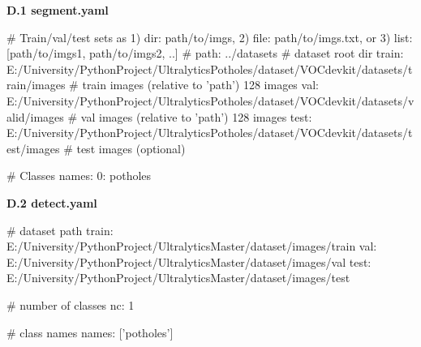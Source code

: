 \documentclass{MathorCupmodeling}
\begin{document}
\newpage

\textbf{D.1 segment.yaml}
\begin{python}
# Train/val/test sets as 1) dir: path/to/imgs, 2) file: path/to/imgs.txt, or 3) list: [path/to/imgs1, path/to/imgs2, ..]
# path: ../datasets  # dataset root dir
train: E:/University/PythonProject/UltralyticsPotholes/dataset/VOCdevkit/datasets/train/images  # train images (relative to 'path') 128 images
val: E:/University/PythonProject/UltralyticsPotholes/dataset/VOCdevkit/datasets/valid/images  # val images (relative to 'path') 128 images
test: E:/University/PythonProject/UltralyticsPotholes/dataset/VOCdevkit/datasets/test/images # test images (optional)

# Classes
names:
  0: potholes
\end{python}

\textbf{D.2 detect.yaml}
\begin{python}
# dataset path
train: E:/University/PythonProject/UltralyticsMaster/dataset/images/train
val: E:/University/PythonProject/UltralyticsMaster/dataset/images/val
test: E:/University/PythonProject/UltralyticsMaster/dataset/images/test

# number of classes
nc: 1

# class names
names: ['potholes']
\end{python}
\end{document}
